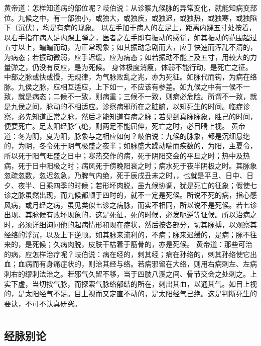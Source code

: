 \documentclass[a4paper,12pt,UTF8,twoside]{ctexbook}
\begin{document}
黄帝道：怎样知道病的部位呢？岐伯说：从诊察九候脉的异常变化，就能知病变部位。九候之中，有一部独小，或独大，或独疾，或独迟，或独热，或独寒，或独陷下（沉伏），均是有病的现象。
以左手加于病人的左足上，距离内踝五寸处按着，以右手指在病人足内踝上弹之，医者之左手即有振动的感觉，如其振动的范围超过五寸以上，蠕蠕而动，为正常现象；如其振动急剧而大，应手快速而浑乱不清的，为病态；若振动微弱，应手迟缓，应为病态；如若振动不能上及五寸，用较大的力量弹之，仍没有反应，是为死候。
身体极度消瘦，体弱不能行动，是死亡之征。中部之脉或快或慢，无规律，为气脉败乱之兆，亦为死征。如脉代而钩，为病在络脉。九侯之脉，应相互适应，上下如一，不应该有参差。如九候之中有一候不一致，就是病态；二候不一致，则病重；三候不一致，则病必危险。所谓不一致，就是九侯之间，脉动的不相适应。诊察病邪所在之脏腑，以知死生的时间。临症诊察，必先知道正常之脉，然后才能知道有病之脉；若见到真脉脉象，胜己的时间，便要死亡。足太阳经脉气绝，则两足不能屈伸，死亡之时，必目睛上视。
黄帝道：冬为阴，夏为阳，脉象与之相应如何？岐伯说：九候的脉象，都是沉细悬绝的，为阴，冬令死于阴气极盛之夜半；如脉盛大躁动喘而疾数的，为阳，主夏令，所以死于阳气旺盛之日中；寒热交作的病，死于阴阳交会的平旦之时；热中及热病，死于日中阳极之时；病风死于傍晚阳衰之时；病水死于夜半阴极之时。其脉象忽疏忽数，忽迟忽急，乃脾气内绝，死于辰戌丑未之时，，也就是平旦、日中、日夕、夜半、日乘四季的时候；若形坏肉脱，虽九候协调，犹是死亡的征象；假使七诊之脉虽然出现，而九候都顺于四时的，就不一定是死候。所说不死的病，指心感风病，或月经之病，虽见类似七诊之病脉，而实不相同，所以说不是死候。若七诊出现、其脉候有败坏现象的，这是死征，死的时候，必发呃逆等证候。所以治病之时，必须详细询问他的起病情形和现在症状，然后按各部分，切其脉搏，以观察其经络的浮沉，以及上下逆顺。如其脉来流利的，不病；脉来迟缓的，是病；脉不往来的，是死候；久病肉脱，皮肤干枯着于筋骨的，亦是死候。
黄帝道：那些可治的病，应怎样治疗呢？岐伯说：病在经的，刺其经；病在孙络的，刺其孙络使它出血；血病而有身痛症状的，则治其经与络。若病邪留在大络，则用右病刺左、左病刺右的缪刺法治之。若邪气久留不移，当于四肢八溪之间、骨节交会之处刺之。上实下虚，当切按气脉，而探索气脉络郁结的所在，刺出其血，以通其气。如目上视的，是太阳经气不足。目上视而又定直不动的，是太阳经气已绝。这是判断死生的要诀，不可不认真研究。

\part{}
\chapter{经脉别论}
\end{document}

